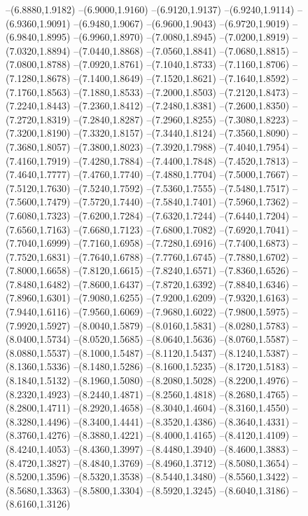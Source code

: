 {\begin{scope}
--(6.8880,1.9182)
--(6.9000,1.9160)
--(6.9120,1.9137)
--(6.9240,1.9114)
--(6.9360,1.9091)
--(6.9480,1.9067)
--(6.9600,1.9043)
--(6.9720,1.9019)
--(6.9840,1.8995)
--(6.9960,1.8970)
--(7.0080,1.8945)
--(7.0200,1.8919)
--(7.0320,1.8894)
--(7.0440,1.8868)
--(7.0560,1.8841)
--(7.0680,1.8815)
--(7.0800,1.8788)
--(7.0920,1.8761)
--(7.1040,1.8733)
--(7.1160,1.8706)
--(7.1280,1.8678)
--(7.1400,1.8649)
--(7.1520,1.8621)
--(7.1640,1.8592)
--(7.1760,1.8563)
--(7.1880,1.8533)
--(7.2000,1.8503)
--(7.2120,1.8473)
--(7.2240,1.8443)
--(7.2360,1.8412)
--(7.2480,1.8381)
--(7.2600,1.8350)
--(7.2720,1.8319)
--(7.2840,1.8287)
--(7.2960,1.8255)
--(7.3080,1.8223)
--(7.3200,1.8190)
--(7.3320,1.8157)
--(7.3440,1.8124)
--(7.3560,1.8090)
--(7.3680,1.8057)
--(7.3800,1.8023)
--(7.3920,1.7988)
--(7.4040,1.7954)
--(7.4160,1.7919)
--(7.4280,1.7884)
--(7.4400,1.7848)
--(7.4520,1.7813)
--(7.4640,1.7777)
--(7.4760,1.7740)
--(7.4880,1.7704)
--(7.5000,1.7667)
--(7.5120,1.7630)
--(7.5240,1.7592)
--(7.5360,1.7555)
--(7.5480,1.7517)
--(7.5600,1.7479)
--(7.5720,1.7440)
--(7.5840,1.7401)
--(7.5960,1.7362)
--(7.6080,1.7323)
--(7.6200,1.7284)
--(7.6320,1.7244)
--(7.6440,1.7204)
--(7.6560,1.7163)
--(7.6680,1.7123)
--(7.6800,1.7082)
--(7.6920,1.7041)
--(7.7040,1.6999)
--(7.7160,1.6958)
--(7.7280,1.6916)
--(7.7400,1.6873)
--(7.7520,1.6831)
--(7.7640,1.6788)
--(7.7760,1.6745)
--(7.7880,1.6702)
--(7.8000,1.6658)
--(7.8120,1.6615)
--(7.8240,1.6571)
--(7.8360,1.6526)
--(7.8480,1.6482)
--(7.8600,1.6437)
--(7.8720,1.6392)
--(7.8840,1.6346)
--(7.8960,1.6301)
--(7.9080,1.6255)
--(7.9200,1.6209)
--(7.9320,1.6163)
--(7.9440,1.6116)
--(7.9560,1.6069)
--(7.9680,1.6022)
--(7.9800,1.5975)
--(7.9920,1.5927)
--(8.0040,1.5879)
--(8.0160,1.5831)
--(8.0280,1.5783)
--(8.0400,1.5734)
--(8.0520,1.5685)
--(8.0640,1.5636)
--(8.0760,1.5587)
--(8.0880,1.5537)
--(8.1000,1.5487)
--(8.1120,1.5437)
--(8.1240,1.5387)
--(8.1360,1.5336)
--(8.1480,1.5286)
--(8.1600,1.5235)
--(8.1720,1.5183)
--(8.1840,1.5132)
--(8.1960,1.5080)
--(8.2080,1.5028)
--(8.2200,1.4976)
--(8.2320,1.4923)
--(8.2440,1.4871)
--(8.2560,1.4818)
--(8.2680,1.4765)
--(8.2800,1.4711)
--(8.2920,1.4658)
--(8.3040,1.4604)
--(8.3160,1.4550)
--(8.3280,1.4496)
--(8.3400,1.4441)
--(8.3520,1.4386)
--(8.3640,1.4331)
--(8.3760,1.4276)
--(8.3880,1.4221)
--(8.4000,1.4165)
--(8.4120,1.4109)
--(8.4240,1.4053)
--(8.4360,1.3997)
--(8.4480,1.3940)
--(8.4600,1.3883)
--(8.4720,1.3827)
--(8.4840,1.3769)
--(8.4960,1.3712)
--(8.5080,1.3654)
--(8.5200,1.3596)
--(8.5320,1.3538)
--(8.5440,1.3480)
--(8.5560,1.3422)
--(8.5680,1.3363)
--(8.5800,1.3304)
--(8.5920,1.3245)
--(8.6040,1.3186)
--(8.6160,1.3126)

\end{scope}}
